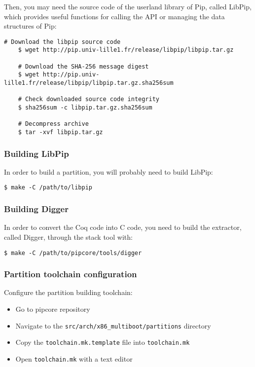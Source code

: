 \documentclass[10pt,a4paper,titlepage]{refart}
\begin{document}
Then, you may need the source code of the userland library of Pip, called
LibPip, which provides useful functions for calling the API or managing the data
structures of Pip:

\begin{lstlisting}[style=BashStyle]
    # Download the libpip source code
    $ wget http://pip.univ-lille1.fr/release/libpip/libpip.tar.gz

    # Download the SHA-256 message digest
    $ wget http://pip.univ-lille1.fr/release/libpip/libpip.tar.gz.sha256sum

    # Check downloaded source code integrity
    $ sha256sum -c libpip.tar.gz.sha256sum

    # Decompress archive
    $ tar -xvf libpip.tar.gz
\end{lstlisting}

\subsubsection{Building LibPip}

In order to build a partition, you will probably need to build LibPip:

\begin{lstlisting}[style=BashStyle]
    $ make -C /path/to/libpip
\end{lstlisting}

\subsubsection{Building Digger}

In order to convert the Coq code into C code, you need to build the extractor,
called Digger, through the stack tool with:

\begin{lstlisting}[style=BashStyle]
    $ make -C /path/to/pipcore/tools/digger
\end{lstlisting}

\subsubsection{Partition toolchain configuration}

Configure the partition building toolchain:

\begin{itemize}
\item Go to pipcore repository
\item Navigate to the \texttt{src/arch/x86\_multiboot/partitions} directory
\item Copy the \texttt{toolchain.mk.template} file into \texttt{toolchain.mk}
\item Open \texttt{toolchain.mk} with a text editor
\end{itemize}
\end{document}
